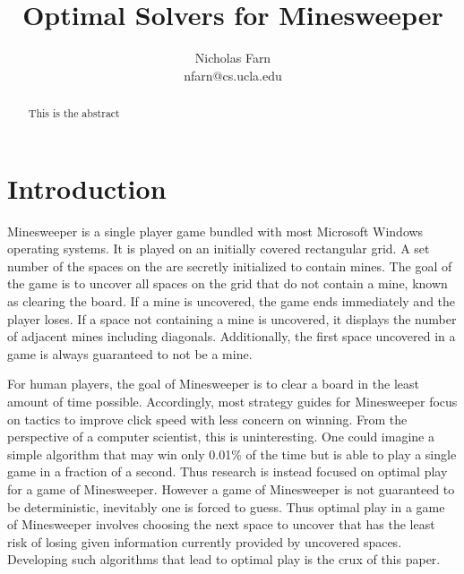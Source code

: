 \documentclass[letterpaper]{article}
\title{Optimal Solvers for Minesweeper}
\author{Nicholas Farn\\ nfarn@cs.ucla.edu}
\begin{document}
\maketitle

\begin{abstract}
This is the abstract
\end{abstract}

\section{Introduction}
Minesweeper is a single player game bundled with most Microsoft Windows operating systems.  It is played on an initially covered rectangular grid.  A set number of the spaces on the are secretly initialized to contain mines.  The goal of the game is to uncover all spaces on the grid that do not contain a mine, known as clearing the board.  If a mine is uncovered, the game ends immediately and the player loses.  If a space not containing a mine is uncovered, it displays the number of adjacent mines including diagonals.  Additionally, the first space uncovered in a game is always guaranteed to not be a mine.

For human players, the goal of Minesweeper is to clear a board in the least amount of time possible.  Accordingly, most strategy guides for Minesweeper focus on tactics to improve click speed with less concern on winning.  From the perspective of a computer scientist, this is uninteresting.  One could imagine a simple algorithm that may win only 0.01\% of the time but is able to play a single game in a fraction of a second.  Thus research is instead focused on optimal play for a game of Minesweeper.  However a game of Minesweeper is not guaranteed to be deterministic, inevitably one is forced to guess.  Thus optimal play in a game of Minesweeper involves choosing the next space to uncover that has the least risk of losing given information currently provided by uncovered spaces.  Developing such algorithms that lead to optimal play is the crux of this paper.
\end{document}
